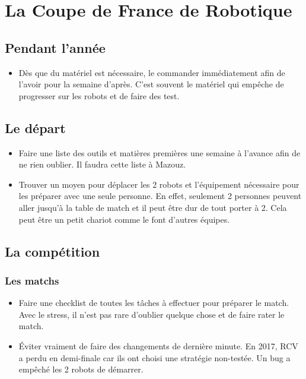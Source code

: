 \documentclass[a4paper, 11pt]{report}
\begin{document}
\part{La Coupe de France de Robotique}

\chapter{Pendant l'année}
\begin{itemize}
\item Dès que du matériel est nécessaire, le commander immédiatement afin de l’avoir pour la semaine d’après. C’est souvent le matériel qui empêche de progresser sur les robots et de faire des test.
\end{itemize}
\chapter{Le départ}
\begin{itemize}
\item Faire une liste des outils et matières premières une semaine à l’avance afin de ne rien oublier. Il faudra cette liste à Mazouz.
\item Trouver un moyen pour déplacer les 2 robots et l’équipement nécessaire pour les préparer avec une seule personne. En effet, seulement 2 personnes peuvent aller jusqu’à la table de match et il peut être dur de tout porter à 2. Cela peut être un petit chariot comme le font d’autres équipes.
\end{itemize}

\chapter{La compétition}

\section{Les matchs}
\begin{itemize}
\item Faire une checklist de toutes les tâches à effectuer pour préparer le match. Avec le stress, il n’est pas rare d’oublier quelque chose et de faire rater le match.
\item Éviter vraiment de faire des changements de dernière minute. En 2017, RCV a perdu en demi-finale car ils ont choisi une stratégie non-testée. Un bug a empêché les 2 robots de démarrer.
\end{itemize}
\end{document}
